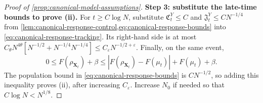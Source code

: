 \begin{proof}[Proof of \cref{prop:canonical-model-assumptions}]
\par\noindent\textbf{Step 3: substitute the late-time bounds to prove (ii).}
For $t\ge C\log N$, substitute
$\mathfrak C_t^Y\le C$ and $\mathfrak J_t^Y\le CN^{-1/4}$ from
\cref{lem:canonical-response-control,eq:canonical-response-bounds}
into \eqref{eq:canonical-response-tracking}. Its right-hand side is
at most $C_\theta N^{4\theta}[N^{-1/2}+N^{-1/4}N^{-1/4}]
\le C_\varepsilon N^{-1/2+\varepsilon}$.
Finally, on the same event,
\[
 0\le F(\rho_{\mathbf X_t})+\beta
 \le |F(\rho_{\mathbf X_t})-F(\mu_t)|+F(\mu_t)+\beta.
\]
The population bound in \eqref{eq:canonical-response-bounds} is
$CN^{-1/2}$, so adding this inequality proves (ii), after increasing
$C_\varepsilon$. Increase $N_0$ if needed so that $C\log N<N^{1/8}$.
\end{proof}
\pagebreak[3]
